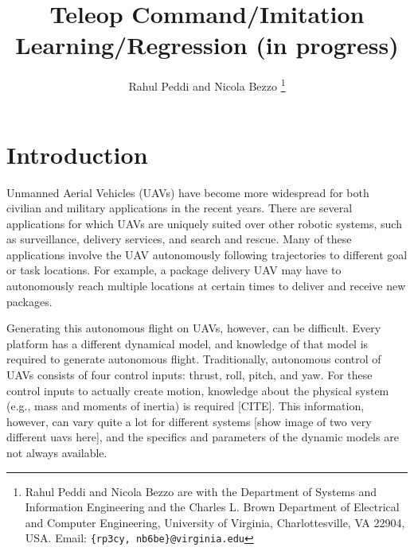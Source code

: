 \documentclass[letterpaper, 10 pt, conference]{ieeeconf}  %
\newcommand\NB[1]{$\spadesuit$\footnote{NB: #1}}
\begin{document}
\title{\LARGE \bf
Teleop Command/Imitation Learning/Regression (in progress)
}


\author{Rahul Peddi and Nicola Bezzo%
\thanks{Rahul Peddi and Nicola Bezzo are with the Department of Systems and Information Engineering and the Charles L. Brown Department of Electrical and Computer Engineering, University of Virginia, Charlottesville, VA 22904, USA. Email: {\tt \{rp3cy, nb6be\}@virginia.edu}}}



\maketitle
\thispagestyle{empty}
\pagestyle{empty}


\begin{abstract}


\end{abstract}


\section{Introduction}
Unmanned Aerial Vehicles (UAVs) have become more widespread for both civilian and military applications in the recent years. There are several applications for which UAVs are uniquely suited over other robotic systems, such as surveillance, delivery services, and search and rescue. Many of these applications involve the UAV autonomously following trajectories to different goal or task locations. For example, a package delivery UAV may have to autonomously reach multiple locations at certain times to deliver and receive new packages. 

Generating this autonomous flight on UAVs, however, can be difficult. Every platform has a different dynamical model, and knowledge of that model is required to generate autonomous flight. Traditionally, autonomous control of UAVs consists of four control inputs: thrust, roll, pitch, and yaw. For these control inputs to actually create motion, knowledge about the physical system (e.g., mass and moments of inertia) is required [CITE]. This information, however, can vary quite a lot for different systems [show image of two very different uavs here], and the specifics and parameters of the dynamic models are not always available.
\end{document}
